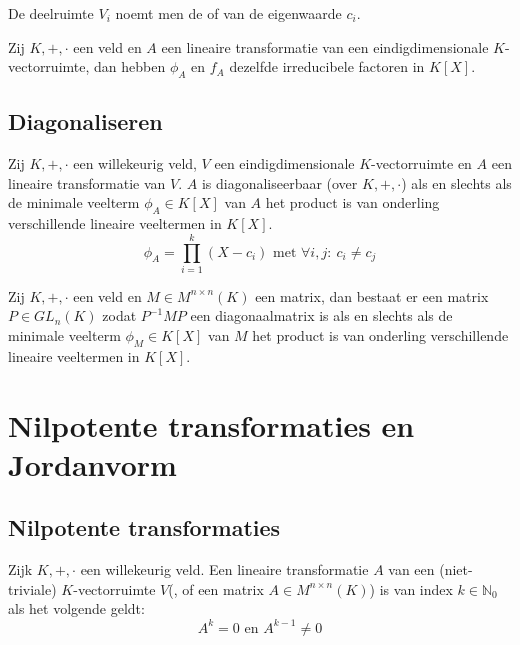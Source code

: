 \documentclass[main.tex]{subfiles}
\begin{document}
\begin{de}
  De deelruimte $V_{i}$ noemt men de  of  van de eigenwaarde $c_{i}$.
\end{de}

\begin{ei}
  Zij $K,+,\cdot$ een veld en $A$ een lineaire transformatie van een eindigdimensionale $K$-vectorruimte, dan hebben $\phi_{A}$ en $f_{A}$ dezelfde irreducibele factoren in $K[X]$.
\end{ei}

\subsection{Diagonaliseren}
\label{sec:diagonaliseren}

\begin{st}
  \examen
  Zij $K,+,\cdot$ een willekeurig veld, $V$ een eindigdimensionale $K$-vectorruimte en $A$ een lineaire transformatie van $V$.
  $A$ is diagonaliseerbaar (over $K,+,\cdot$) als en slechts als de minimale veelterm $\phi_{A}\in K[X]$ van $A$ het product is van onderling verschillende lineaire veeltermen in $K[X]$.
  \[ \phi_{A} = \prod_{i=1}^{k}(X-c_{i}) \text{ met } \forall i,j:\ c_{i} \neq c_{j} \]
\end{st}

\begin{ei}
  Zij $K,+,\cdot$ een veld en $M\in M^{n\times n}(K)$ een matrix, dan bestaat er een matrix $P \in GL_{n}(K)$ zodat $P^{-1}MP$ een diagonaalmatrix is als en slechts als de minimale veelterm $\phi_{M}\in K[X]$ van $M$ het product is van onderling verschillende lineaire veeltermen in $K[X]$.
\end{ei}

\section{Nilpotente transformaties en Jordanvorm}
\label{sec:nilp-transf-en}

\subsection{Nilpotente transformaties}
\label{sec:nilp-transf}

\begin{de}
  Zijk $K,+,\cdot$ een willekeurig veld.
  Een lineaire transformatie $A$ van een (niet-triviale) $K$-vectorruimte $V$(, of een matrix $A\in M^{n\times n}(K)$) is  van index $k\in \mathbb{N}_{0}$ als het volgende geldt:
  \[ A^{k} = 0 \text{ en } A^{k-1} \neq 0 \]
\end{de}
\end{document}
